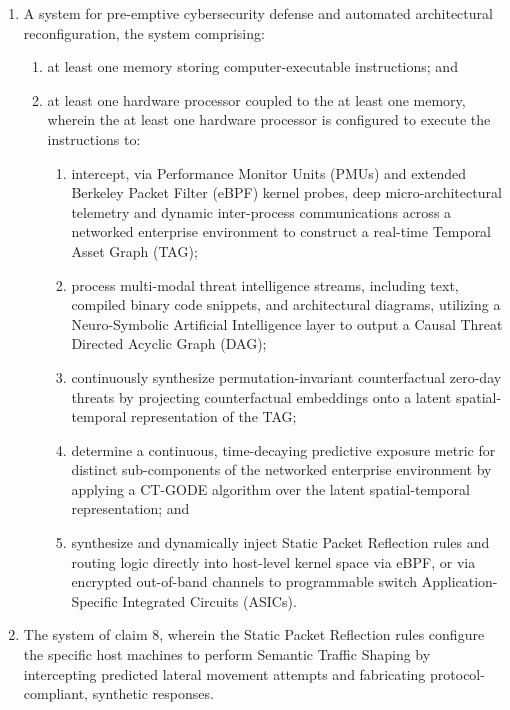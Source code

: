 \documentclass[12pt, letterpaper]{article}
\begin{document}
\begin{enumerate}[label=\textbf{\arabic*.}, leftmargin=*]
    \item A system for pre-emptive cybersecurity defense and automated architectural reconfiguration, the system comprising:
    \begin{enumerate}[label=(\alph*)]
        \item at least one memory storing computer-executable instructions; and
        \item at least one hardware processor coupled to the at least one memory, wherein the at least one hardware processor is configured to execute the instructions to:
        \begin{enumerate}[label=\roman*.]
            \item intercept, via Performance Monitor Units (PMUs) and extended Berkeley Packet Filter (eBPF) kernel probes, deep micro-architectural telemetry and dynamic inter-process communications across a networked enterprise environment to construct a real-time Temporal Asset Graph (TAG);
            \item process multi-modal threat intelligence streams, including text, compiled binary code snippets, and architectural diagrams, utilizing a Neuro-Symbolic Artificial Intelligence layer to output a Causal Threat Directed Acyclic Graph (DAG);
            \item continuously synthesize permutation-invariant counterfactual zero-day threats by projecting counterfactual embeddings onto a latent spatial-temporal representation of the TAG;
            \item determine a continuous, time-decaying predictive exposure metric for distinct sub-components of the networked enterprise environment by applying a CT-GODE algorithm over the latent spatial-temporal representation; and
            \item synthesize and dynamically inject Static Packet Reflection rules and routing logic directly into host-level kernel space via eBPF, or via encrypted out-of-band channels to programmable switch Application-Specific Integrated Circuits (ASICs).
        \end{enumerate}
    \end{enumerate}

    \item The system of claim 8, wherein the Static Packet Reflection rules configure the specific host machines to perform Semantic Traffic Shaping by intercepting predicted lateral movement attempts and fabricating protocol-compliant, synthetic responses.


\end{enumerate}
\end{document}
